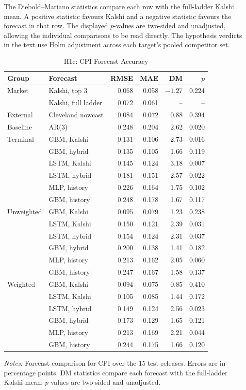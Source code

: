 \documentclass[12pt,a4paper]{report}
\newcommand{\tablenote}[1]{%
  \par\vspace{0.4em}%
  \begin{minipage}{0.9\textwidth}%
  \footnotesize\raggedright\emph{Notes:} #1%
  \end{minipage}%
}
\begin{document}
The Diebold--Mariano statistics compare each row with the full-ladder Kalshi
mean. A positive statistic favours Kalshi and a negative statistic favours the
forecast in that row. The displayed $p$-values are two-sided and unadjusted,
allowing the individual comparisons to be read directly. The hypothesis
verdicts in the text use Holm adjustment across each target's pooled competitor
set.

\begin{table}[H]
\centering
\caption{H1c: CPI Forecast Accuracy}
\label{tab:h1c-cpi}
\footnotesize
\begin{tabular}{@{}llrrrr@{}}
\toprule
Group & Forecast & RMSE & MAE & DM & $p$ \\
\midrule
Market & Kalshi, top 3 & 0.068 & 0.058 & $-1.27$ & 0.224 \\
 & Kalshi, full ladder & 0.072 & 0.061 & -- & -- \\
\midrule
External & Cleveland nowcast & 0.084 & 0.072 & 0.88 & 0.394 \\
\midrule
Baseline & AR(3) & 0.248 & 0.204 & 2.62 & 0.020 \\
\midrule
Terminal & GBM, Kalshi & 0.131 & 0.106 & 2.73 & 0.016 \\
 & GBM, hybrid & 0.135 & 0.105 & 1.66 & 0.119 \\
 & LSTM, Kalshi & 0.145 & 0.124 & 3.18 & 0.007 \\
 & LSTM, hybrid & 0.181 & 0.151 & 2.57 & 0.022 \\
 & MLP, history & 0.226 & 0.164 & 1.75 & 0.102 \\
 & GBM, history & 0.248 & 0.178 & 1.67 & 0.117 \\
\midrule
Unweighted & GBM, Kalshi & 0.095 & 0.079 & 1.23 & 0.238 \\
 & LSTM, Kalshi & 0.150 & 0.121 & 2.39 & 0.031 \\
 & LSTM, hybrid & 0.154 & 0.124 & 2.31 & 0.037 \\
 & GBM, hybrid & 0.200 & 0.138 & 1.41 & 0.182 \\
 & MLP, history & 0.213 & 0.162 & 2.05 & 0.060 \\
 & GBM, history & 0.247 & 0.167 & 1.58 & 0.137 \\
\midrule
Weighted & GBM, Kalshi & 0.094 & 0.075 & 0.85 & 0.410 \\
 & LSTM, Kalshi & 0.105 & 0.085 & 1.44 & 0.172 \\
 & LSTM, hybrid & 0.149 & 0.124 & 2.56 & 0.023 \\
 & GBM, hybrid & 0.173 & 0.129 & 1.65 & 0.121 \\
 & MLP, history & 0.213 & 0.169 & 2.21 & 0.044 \\
 & GBM, history & 0.244 & 0.175 & 1.66 & 0.120 \\
\bottomrule
\end{tabular}
\tablenote{Forecast comparison for CPI over the 15 test releases. Errors are
in percentage points. DM statistics compare each forecast with the full-ladder
Kalshi mean; $p$-values are two-sided and unadjusted.}
\end{table}
\end{document}
